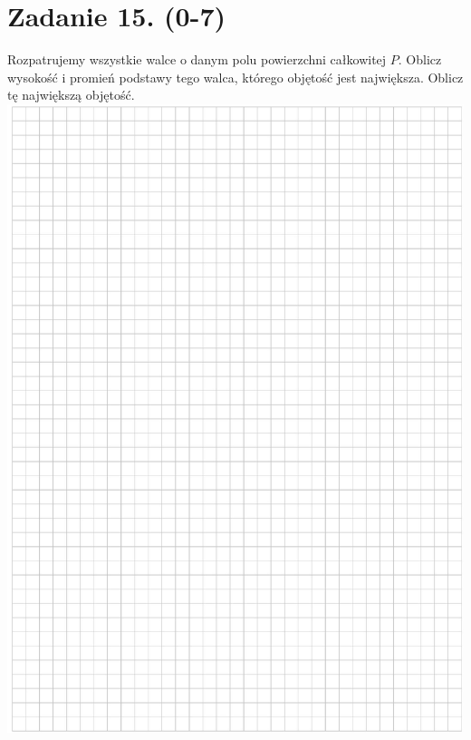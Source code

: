 \documentclass[10pt]{article}
\begin{document}
\section*{Zadanie 15. (0-7)}
Rozpatrujemy wszystkie walce o danym polu powierzchni całkowitej \(P\). Oblicz wysokość i promień podstawy tego walca, którego objętość jest największa. Oblicz tę największą objętość.\\
\includegraphics[max width=\textwidth, center]{2024_11_21_3120cbc7edd07b3a101fg-16}\\
\end{document}
